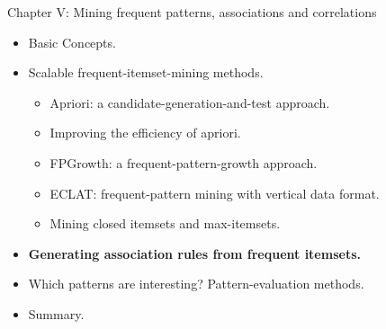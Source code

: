 \documentclass[aspectratio=169,t,xcolor=dvipsnames]{beamer}
\begin{document}
  {
    \begin{frame}{Chapter V: Mining frequent patterns, associations and correlations}
        \begin{itemize}
            \item Basic Concepts.
            \item Scalable frequent-itemset-mining methods.
            \begin{itemize}
              \item Apriori: a candidate-generation-and-test approach.
              \item Improving the efficiency of apriori.
              \item FPGrowth:  a frequent-pattern-growth approach.
              \item ECLAT: frequent-pattern mining with vertical data format.
              \item Mining closed itemsets and max-itemsets.
            \end{itemize}
            \item \textbf{Generating association rules from frequent itemsets.}
            \item Which patterns are interesting? Pattern-evaluation methods.
            \item Summary.
        \end{itemize}
    \end{frame}
  }
\end{document}
